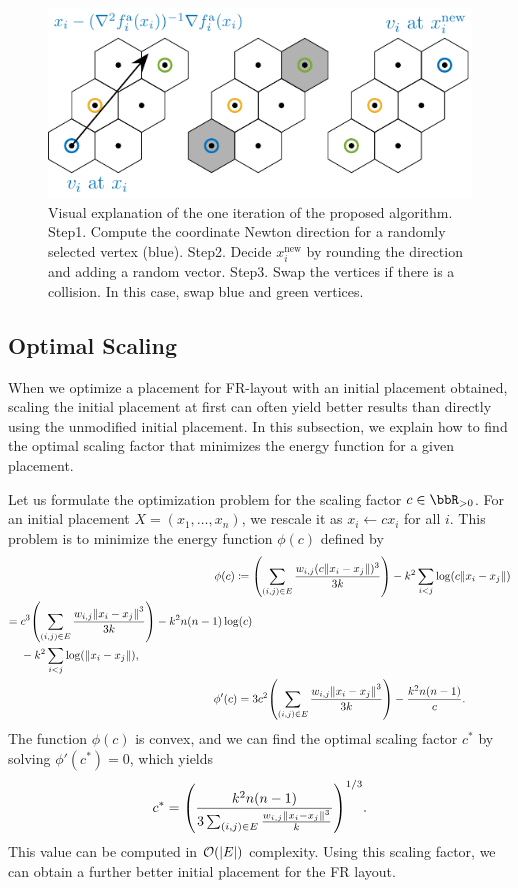\documentclass[dvipdfmx,10pt,journal,compsoc]{IEEEtran}
\newcommand{\defeq}{\coloneqq}
\begin{document}
\begin{figure}[t]
  \centering
  \includegraphics[width=\columnwidth]{hex/hex.pdf}
  \caption{Visual explanation of the one iteration of the proposed algorithm. Step1. Compute the coordinate Newton direction for a randomly selected vertex (blue). Step2. Decide $x_i^\mathrm{new}$ by rounding the direction and adding a random vector. Step3. Swap the vertices if there is a collision. In this case, swap blue and green vertices.}
  \label{fig:hex}
\end{figure}

\subsection{Optimal Scaling}\label{ssec:optimalScaling}

When we optimize a placement for FR-layout with an initial placement obtained, scaling the initial placement at first can often yield better results than directly using the unmodified initial placement.
In this subsection, we explain how to find the optimal scaling factor that minimizes the energy function for a given placement.

Let us formulate the optimization problem for the scaling factor $c \in \bbR_{> 0}$.
For an initial placement $X = (x_1, \dots, x_n)$, we rescale it as $x_i \gets c x_i$ for all $i$.
This problem is to minimize the energy function $\phi(c)$ defined by
\begin{align*}
  \phi(c) \defeq {} & \qty(\sum_{(i,j) \in E} \frac{w_{i,j} (c \norm{x_i - x_j})^3}{3k}) - k^2 \sum_{i < j} \log(c \norm{x_i - x_j})     \\
  \begin{split}
    = {} & c^3 \qty(\sum_{(i,j) \in E} \frac{w_{i,j} \norm{x_i - x_j}^3}{3k}) - k^2 n(n-1)\log(c) \\
         & - k^2 \sum_{i < j} \log(\norm{x_i - x_j}),
  \end{split} \\
  \phi'(c) = {}     & 3c^2 \qty(\sum_{(i,j) \in E} \frac{w_{i,j} \norm{x_i - x_j}^3}{3k}) - \frac{k^2 n(n-1)}{c}.
\end{align*}
The function $\phi(c)$ is convex, and we can find the optimal scaling factor $c^*$ by solving $\phi'(c^*) = 0$, which yields
\begin{equation}\label{eq:scaling}
  c^* = \qty(\frac{k^2 n(n-1)}{3 \sum_{(i,j) \in E} \frac{w_{i,j} \norm{x_i - x_j}^3}{k}})^{1/3}.
\end{equation}
This value can be computed in $\order{\abs{E}}$ complexity.
Using this scaling factor, we can obtain a further better initial placement for the FR layout.
\end{document}
